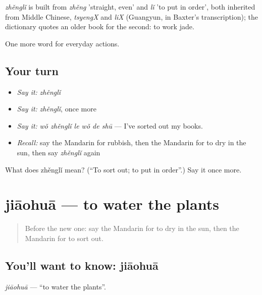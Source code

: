 \begin{cousinweb}
\emph{zhěnglǐ} is built from \emph{zhěng} 'straight, even' and \emph{lǐ} 'to put in order', both inherited from Middle Chinese, \emph{tsyengX} and \emph{liX} (Guangyun, in Baxter's transcription); the dictionary quotes an older book for the second: to work jade.
\end{cousinweb}

\begin{grammarlens}[title={What you've built}]
One more word for everyday actions.
\end{grammarlens}

\subsection*{Your turn}
\begin{itemize}
\raggedright
  \item \emph{Say it:} \emph{zhěnglǐ}
  \item \emph{Say it:} \emph{zhěnglǐ}, once more
  \item \emph{Say it:} \emph{wǒ zhěnglǐ le wǒ de shū} — I've sorted out my books.
  \item \emph{Recall:} say the Mandarin for rubbish, then the Mandarin for to dry in the sun, then say \emph{zhěnglǐ} again
\end{itemize}

\begin{tcolorbox}[breakable,colback=teal!4,colframe=teal!35!black,title={Before you move on}]
What does zhěnglǐ mean? (\textquotedblleft{}To sort out; to put in order\textquotedblright{}.) Say it once more.
\end{tcolorbox}
\section[jiāohuā]{jiāohuā — to water the plants}

\label{lesson:ZH-C142-jiaohua}



\begin{quote}
Before the new one: say the Mandarin for to dry in the sun, then the Mandarin for to sort out.
\end{quote}

\subsection*{You'll want to know: jiāohuā}
\emph{jiāohuā} — \textquotedblleft{}to water the plants\textquotedblright{}.

